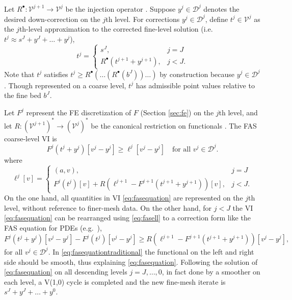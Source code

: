 \documentclass[letterpaper,final,12pt,reqno]{amsart}
\theoremstyle{claim}
\newcommand{\ip}[2]{\left(#1,#2\right)}
\newcommand{\iR}{R^{\bullet}}
\numberwithin{equation}{section}
\numberwithin{figure}{section}
\numberwithin{table}{section}
\numberwithin{theorem}{section}
\begin{document}
Let $\iR: \mathcal{V}^{j+1} \to \mathcal{V}^j$ be the injection operator \cite{Trottenbergetal2001}.  Suppose $y^j \in \mathcal{D}^j$ denotes the desired down-correction on the $j$th level.  For corrections $y^j \in \mathcal{D}^j$, define $t^j \in \mathcal{V}^j$ as the $j$th-level approximation to the corrected fine-level solution (i.e.~$t^j \approx s^J + y^J + \dots + y^j$),
\begin{equation}
t^j = \begin{cases} s^J, & j=J \\
                    \iR(t^{j+1} + y^{j+1}), & j < J.
      \end{cases}  \label{eq:fassolution}
\end{equation}
Note that $t^j$ satisfies $t^j \ge \iR(\dots(\iR(b^J))\dots)$ by construction because $y^j \in \mathcal{D}^j$.  Though represented on a coarse level, $t^j$ has admissible point values relative to the fine bed $b^J$.

Let $F^j$ represent the FE discretization of $F$ (Section \ref{sec:fe}) on the $j$th level, and let $R: (\mathcal{V}^{j+1})^* \to (\mathcal{V}^j)^*$ be the canonical restriction on functionals \cite{GraeserKornhuber2009}.  The FAS coarse-level VI is
\begin{equation}
F^j(t^j+y^j)[v^j-y^j] \ge \ell^j[v^j-y^j] \quad \text{for all } v^j \in \mathcal{D}^j. \label{eq:fasequation}
\end{equation}
where
\begin{equation}
\ell^j[v] = \begin{cases} \ip{a}{v}, & j=J \\
                          F^j(t^j)[v] + R \left(\ell^{j+1} - F^{j+1}(t^{j+1}+y^{j+1})\right)[v], & j < J. \end{cases}  \label{eq:fasell}
\end{equation}
On the one hand, all quantities in VI \eqref{eq:fasequation} are represented on the $j$th level, without reference to finer-mesh data.  On the other hand, for $j<J$ the VI \eqref{eq:fasequation} can be rearranged using \eqref{eq:fasell} to a correction form like the FAS equation for PDEs (e.g.~\cite[equation (5.3.12)]{Trottenbergetal2001}),
\begin{equation}
F^j(t^j+y^j)[v^j-y^j] - F^j(t^j)[v^j-y^j] \ge R \left(\ell^{j+1} - F^{j+1}(t^{j+1}+y^{j+1})\right)[v^j-y^j], \label{eq:fasequationtraditional}
\end{equation}
for all $v^j \in \mathcal{D}^j$.  In \eqref{eq:fasequationtraditional} the functional on the left and right side should be smooth, thus explaining \eqref{eq:fasequation}.  Following the solution of \eqref{eq:fasequation} on all descending levels $j=J,\dots,0$, in fact done by a smoother on each level, a V(1,0) cycle is completed and the new fine-mesh iterate is $s^J + y^J + \dots + y^0$.
\end{document}
